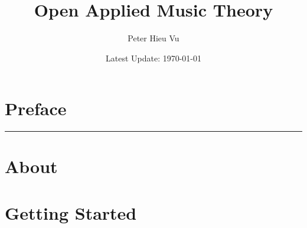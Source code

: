 \documentclass[12pt]{book}
\title{Open Applied Music Theory}
\author{Peter Hieu Vu}
\date{Latest Update: \today}
\newcommand\onlyinsubfile[1]{#1}
\newcommand\notinsubfile[1]{}
\begin{document}
    \renewcommand{\onlyinsubfile}[1]{}
    \renewcommand{\notinsubfile}[1]{#1}

    \maketitle

    \frontmatter
    \chapter{Preface}
    \rule{6cm}{1pt}
        

    \chapter{About}
        

    \tableofcontents


    \mainmatter 
    \setcounter{chapter}{-1}
    
    \chapter{Getting Started}
        
    
\end{document}
